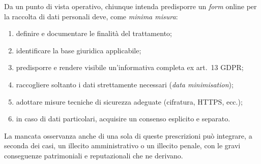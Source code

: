 \documentclass[12pt, a4paper]{article}
\begin{document}
Da un punto di vista operativo, chiunque intenda predisporre un \emph{form}
online per la raccolta di dati personali deve, come \emph{minima misura}:

\begin{enumerate}[label=\arabic*., leftmargin=1.5cm]
  \item definire e documentare le finalità del trattamento;
  \item identificare la base giuridica applicabile;
  \item predisporre e rendere visibile un'informativa completa ex art.~13 GDPR;
  \item raccogliere soltanto i dati strettamente necessari (\emph{data minimisation});
  \item adottare misure tecniche di sicurezza adeguate (cifratura, HTTPS, ecc.);
  \item in caso di dati particolari, acquisire un consenso esplicito e separato.
\end{enumerate}

La mancata osservanza anche di una sola di queste prescrizioni può
integrare, a seconda dei casi, un illecito amministrativo o un illecito penale,
con le gravi conseguenze patrimoniali e reputazionali che ne derivano.

\newpage
{}
{}
\printbibliography[title={Riferimenti normativi e bibliografici}]
\end{document}
